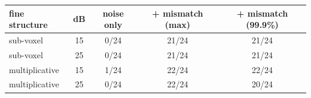 \begin{tabular}{@{}lc ccc@{}}\toprule
fine structure & dB & noise only & + mismatch (max) & + mismatch (99.9\%)\\\midrule
sub-voxel & 15 & 0/24 & 21/24 & 21/24\\
sub-voxel & 25 & 0/24 & 21/24 & 21/24\\
multiplicative & 15 & 1/24 & 22/24 & 22/24\\
multiplicative & 25 & 0/24 & 22/24 & 20/24\\
\bottomrule\end{tabular}
